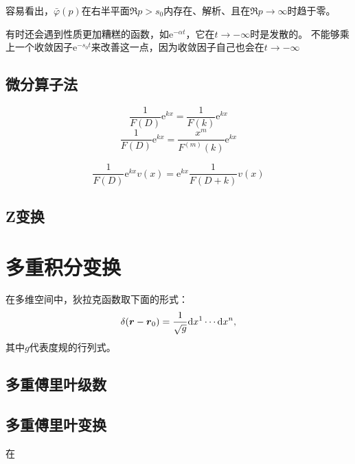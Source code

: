 \documentclass[UTF8]{ctexart}
\newcommand*{\ee}{\mathrm{e}}
\begin{document}
容易看出，$\bar{\varphi}(p)$在右半平面$\Re p >s_0$内存在、解析、且在$\Re p \to \infty$时趋于零。

有时还会遇到性质更加糟糕的函数，如$\ee^{-\alpha t}$，它在$t \to -\infty$时是发散的。
不能够乘上一个收敛因子$\ee^{-s_0 t}$来改善这一点，因为收敛因子自己也会在$t \to -\infty$


\subsection{微分算子法}

\[
    \frac{1}{F(D)} \ee^{kx} = \frac{1}{F(k)} \ee^{kx}
\]
\[
    \frac{1}{F(D)} \ee^{kx} = \frac{x^m}{F^{(m)}(k)} \ee^{kx}
\]

\[
    \frac{1}{F(D)} \ee^{kx} v(x) = \ee^{kx} \frac{1}{F(D+k)} v(x)
\]

\subsection{Z变换}

\section{多重积分变换}

在多维空间中，狄拉克函数取下面的形式：
\begin{equation}
    \delta(\vb*{r} - \vb*{r}_0) = \frac{1}{\sqrt{g}} \dd x^1 \cdots \dd x^n,
\end{equation}
其中$g$代表度规的行列式。

\subsection{多重傅里叶级数}

\subsection{多重傅里叶变换}

在
\end{document}

